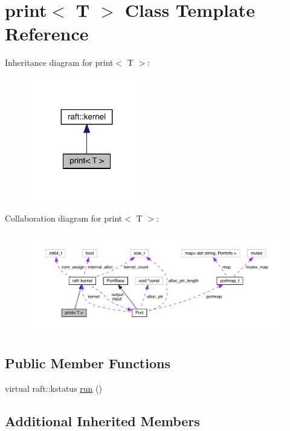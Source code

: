 \hypertarget{classprint}{}\section{print$<$ T $>$ Class Template Reference}
\label{classprint}


Inheritance diagram for print$<$ T $>$\+:
\nopagebreak
\begin{figure}[H]
\begin{center}
\leavevmode
\includegraphics[width=143pt]{classprint__inherit__graph}
\end{center}
\end{figure}


Collaboration diagram for print$<$ T $>$\+:
\nopagebreak
\begin{figure}[H]
\begin{center}
\leavevmode
\includegraphics[width=350pt]{classprint__coll__graph}
\end{center}
\end{figure}
\subsection*{Public Member Functions}
\begin{DoxyCompactItemize}
\item 
virtual raft\+::kstatus \hyperlink{classprint_aa547f61c584b4044e4a0dfc2410e5adc}{run} ()
\end{DoxyCompactItemize}
\subsection*{Additional Inherited Members}


